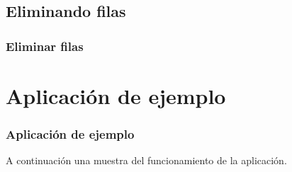 \documentclass[24pt, a4paper, oneside, spanish]{beamer}
\begin{document}
	\subsection{Eliminando filas}
	\begin{frame}
	\frametitle{Eliminar filas}
	
	
	\end{frame}
	
\section{Aplicación de ejemplo}
	\begin{frame}
	\frametitle{Aplicación de ejemplo}
	
	
	
	A continuación una muestra del funcionamiento de la aplicación.
	\end{frame}
	
\end{document}
